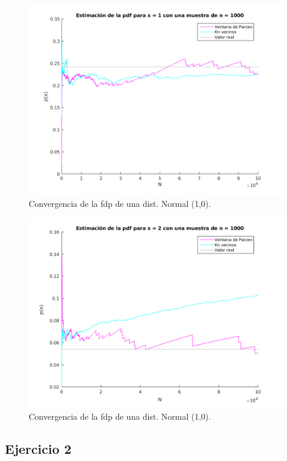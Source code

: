 \begin{figure}[ht!]
\centering
\includegraphics[width=120mm]{img/tp3/ej1-2.png}
\caption{Convergencia de la fdp de una dist. Normal (1,0).}
\end{figure}

\begin{figure}[ht!]
\centering
\includegraphics[width=120mm]{img/tp3/ej1-3.png}
\caption{Convergencia de la fdp de una dist. Normal (1,0).}
\end{figure}

\subsection{Ejercicio 2}

